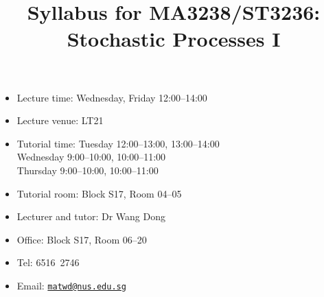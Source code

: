 \documentclass[a4paper]{article}
\title{Syllabus for MA3238/ST3236: Stochastic Processes I}
\date{}
\begin{document}
\maketitle

\begin{minipage}[t]{0.5\linewidth}
  \begin{itemize}[leftmargin=*]
  \item Lecture time: Wednesday, Friday 12:00--14:00
  \item Lecture venue: LT21
  \item Tutorial time: Tuesday 12:00--13:00, 13:00--14:00 \\
    \phantom{Tutorial time:} Wednesday 9:00--10:00, 10:00--11:00 \\
    \phantom{Tutorial time:} Thursday 9:00--10:00, 10:00--11:00
  \item Tutorial room: Block S17, Room 04--05 
  \end{itemize}
\end{minipage}
\begin{minipage}[t]{0.4\linewidth}
  \begin{itemize}
  \item Lecturer and tutor: Dr Wang Dong
  \item Office: Block S17, Room 06--20
  \item Tel: 6516\ 2746
  \item Email: \href{mailto:matwd@nus.edu.sg}{\nolinkurl{matwd@nus.edu.sg}}
  \end{itemize}
\end{minipage}
\end{document}
